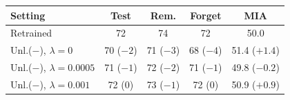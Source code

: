 {\footnotesize\setlength{\tabcolsep}{3pt}
\begin{tabular}{@{}lcccc@{}}
\toprule
Setting & Test & Rem. & Forget & MIA \\
\midrule
Retrained & 72 & 74 & 72 & 50.0 \\
Unl.($-$), $\lambda{=}0$ & 70 ($-2$) & 71 ($-3$) & 68 ($-4$) & 51.4 ($+1.4$) \\
Unl.($-$), $\lambda{=}0.0005$ & 71 ($-1$) & 72 ($-2$) & 71 ($-1$) & 49.8 ($-0.2$) \\
Unl.($-$), $\lambda{=}0.001$ & 72 (0) & 73 ($-1$) & 72 (0) & 50.9 ($+0.9$) \\
\bottomrule
\end{tabular}}
